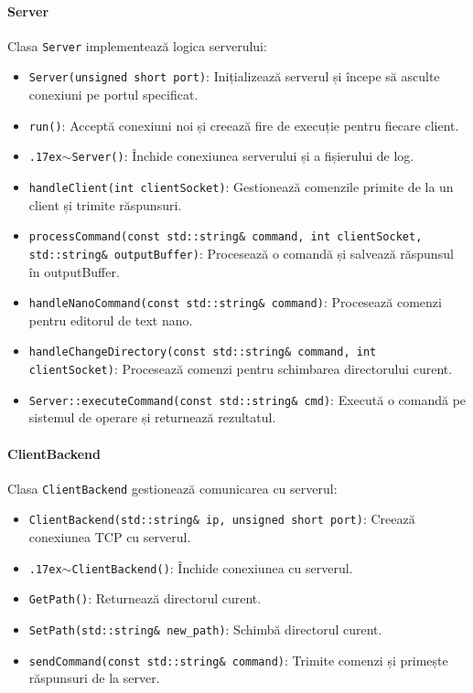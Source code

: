 \documentclass[runningheads]{llncs}
\begin{document}
\paragraph{Server}
Clasa \texttt{Server} implementează logica serverului:
\begin{itemize}
    \item \texttt{Server(unsigned short port)}: Inițializează serverul și începe să asculte conexiuni pe portul specificat.
    \item \texttt{run()}: Acceptă conexiuni noi și creează fire de execuție pentru fiecare client.
    \item \texttt{{\raise.17ex\hbox{$\scriptstyle\sim$}}Server()}: Închide conexiunea serverului și a fișierului de log.
    \item \texttt{handleClient(int clientSocket)}: Gestionează comenzile primite de la un client și trimite răspunsuri.
    \item \texttt{processCommand(const std::string\& command, int clientSocket, std::string\& outputBuffer)}: Procesează o comandă și salvează răspunsul în outputBuffer.
    \item \texttt{handleNanoCommand(const std::string\& command)}: Procesează comenzi pentru editorul de text nano.
    \item \texttt{handleChangeDirectory(const std::string\& command, int clientSocket)}: Procesează comenzi pentru schimbarea directorului curent.
    \item \texttt{Server::executeCommand(const std::string\& cmd)}: Execută o comandă pe sistemul de operare și returnează rezultatul.
\end{itemize}

\paragraph{ClientBackend}
Clasa \texttt{ClientBackend} gestionează comunicarea cu serverul:
\begin{itemize}
    \item \texttt{ClientBackend(std::string\& ip, unsigned short port)}: Creează conexiunea TCP cu serverul.
    \item \texttt{{\raise.17ex\hbox{$\scriptstyle\sim$}}ClientBackend()}: Închide conexiunea cu serverul.
    \item \texttt{GetPath()}: Returnează directorul curent.
    \item \texttt{SetPath(std::string\& new_path)}: Schimbă directorul curent.
    \item \texttt{sendCommand(const std::string\& command)}: Trimite comenzi și primește răspunsuri de la server.
\end{itemize}
\end{document}
